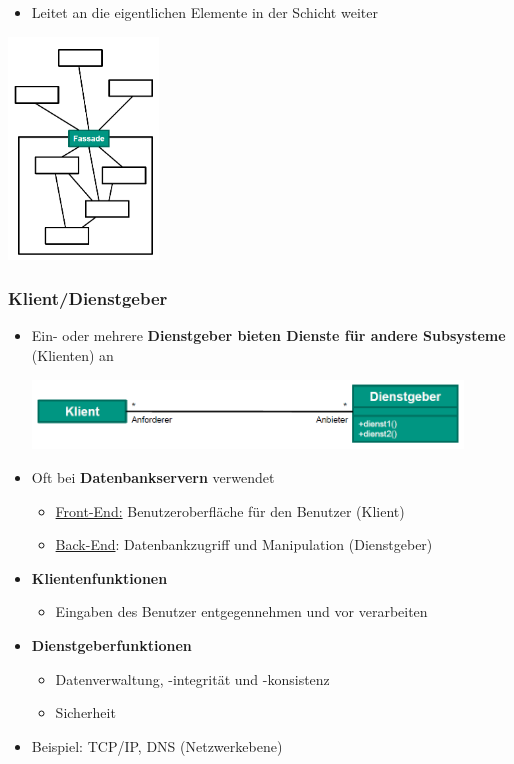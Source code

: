 \documentclass[parskip=full, 12pt]{scrartcl}
\begin{document}
				\begin{itemize}
					\item Leitet an die eigentlichen Elemente in der Schicht weiter
				\end{itemize}
			
				\begin{center}
					\includegraphics[width=0.3\textwidth]{../images/fassadeSchichtenarchitektur.png}
				\end{center}
	
			\subsubsection{Klient/Dienstgeber}
			
				\begin{itemize}
					\item Ein- oder mehrere \textbf{Dienstgeber bieten Dienste für andere Subsysteme} (Klienten) an
					\begin{center}
						\includegraphics[width=0.9\textwidth]{../images/klientDienstgeber.png}
					\end{center}
					\item Oft bei \textbf{Datenbankservern} verwendet
					\begin{itemize}
						\item \underline{Front-End:} Benutzeroberfläche für den Benutzer (Klient)
						\item \underline{Back-End}: Datenbankzugriff und Manipulation (Dienstgeber)
					\end{itemize}
					\item \textbf{Klientenfunktionen}
					\begin{itemize}
						\item Eingaben des Benutzer entgegennehmen und vor verarbeiten
					\end{itemize}
					\item \textbf{Dienstgeberfunktionen}
					\begin{itemize}
						\item Datenverwaltung, -integrität und -konsistenz
						\item Sicherheit
					\end{itemize}		
					\item Beispiel: TCP/IP, DNS (Netzwerkebene)		
				\end{itemize}	
	
\end{document}

